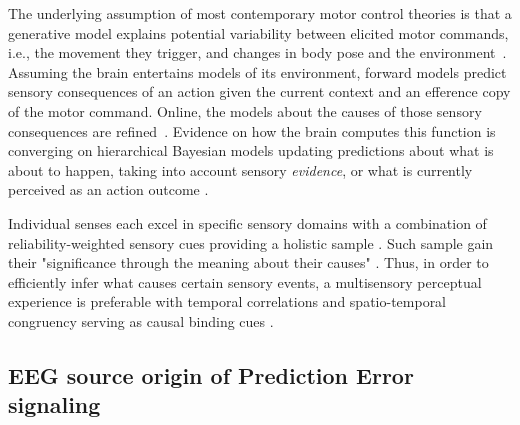 The underlying assumption of most contemporary motor control theories is that a generative model explains potential variability between elicited motor commands, i.e., the movement they trigger, and changes in body pose and the environment~\cites{Wolpert2011, Shadmehr2010}. Assuming the brain entertains models of its environment, forward models predict sensory consequences of an action given the current context and an efference copy of the motor command. Online, the models about the causes of those sensory consequences are refined~\cites{Pearson2011, Friston2010, Friston2016a}. Evidence on how the brain computes this function is converging on hierarchical Bayesian models updating predictions about what is about to happen, taking into account sensory \textit{evidence}, or what is currently perceived as an action outcome \cite{Knill2004, Shams2010}.

Individual senses each excel in specific sensory domains with a combination of reliability-weighted sensory cues providing a holistic sample \cite{Fetsch2012, Cao2019}. Such sample gain their "significance through the meaning about their causes" \cite{Kording2007}. Thus, in order to efficiently infer what causes certain sensory events, a multisensory perceptual experience is preferable with temporal correlations and spatio-temporal congruency serving as causal binding cues \cite{Robertson2003}. 



\subsection{EEG source origin of Prediction Error signaling} %

